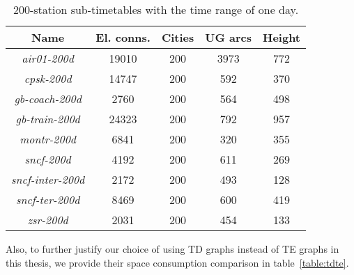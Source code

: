 	\begin{table}[h!]
		\centering
		\small
		\begin{tabular}{c|c|c|c|c}
			\rowcolor{tablehead}
			\textbf{Name} & \textbf{El. conns.} & \textbf{Cities} & \textbf{UG arcs} & \textbf{Height} \\
			\hline
			\textit{air01-200d} & 19010 & 200 & 3973 & 772 \\
			\textit{cpsk-200d} & 14747 & 200 & 592 & 370 \\
			\textit{gb-coach-200d} & 2760 & 200 & 564 & 498 \\
			\textit{gb-train-200d} & 24323 & 200 & 792 & 957 \\
			\textit{montr-200d} & 6841 & 200 & 320 & 355 \\
			\textit{sncf-200d} & 4192 & 200 & 611 & 269 \\		
			\textit{sncf-inter-200d} & 2172 & 200 & 493 & 128 \\
			\textit{sncf-ter-200d} & 8469 & 200 & 600 & 419 \\
			\textit{zsr-200d} & 2031 & 200 & 454 & 133 \\
		\end{tabular}
		\caption{\label{table:tt_200mainpr} 200-station sub-timetables with the time range of one day.}
		\normalsize
	\end{table}
	
	\noindent Also, to further justify our choice of using TD graphs instead of TE graphs in this thesis, we provide their space consumption comparison in table~\ref{table:tdte}. \\
	
